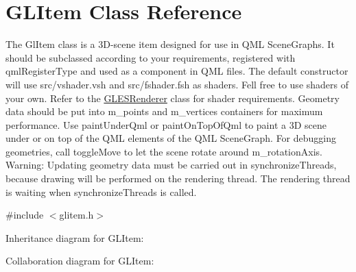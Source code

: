 \hypertarget{class_g_l_item}{}\section{G\+L\+Item Class Reference}
\label{class_g_l_item}


The Gl\+Item class is a 3D-\/scene item designed for use in Q\+ML Scene\+Graphs. It should be subclassed according to your requirements, registered with qml\+Register\+Type and used as a component in Q\+ML files. The default constructor will use src/vshader.\+vsh and src/fshader.\+fsh as shaders. Fell free to use shaders of your own. Refer to the \mbox{\hyperlink{class_g_l_e_s_renderer}{G\+L\+E\+S\+Renderer}} class for shader requirements. Geometry data should be put into m\+\_\+points and m\+\_\+vertices containers for maximum performance. Use paint\+Under\+Qml or paint\+On\+Top\+Of\+Qml to paint a 3D scene under or on top of the Q\+ML elements of the Q\+ML Scene\+Graph. For debugging geometries, call toggle\+Move to let the scene rotate around m\+\_\+rotation\+Axis. Warning\+: Updating geometry data must be carried out in synchronize\+Threads, because drawing will be performed on the rendering thread. The rendering thread is waiting when synchronize\+Threads is called.  




{\ttfamily \#include $<$glitem.\+h$>$}



Inheritance diagram for G\+L\+Item\+:


Collaboration diagram for G\+L\+Item\+:
